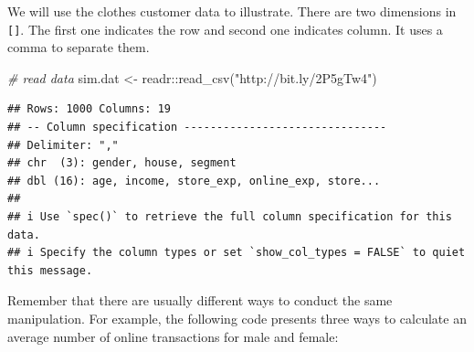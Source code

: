 \documentclass[
  12pt,
]{krantz}
\makeatletter
\newenvironment{Shaded}{\begin{snugshade}}{\end{snugshade}}
\newcommand{\CommentTok}[1]{\textcolor[rgb]{0.37,0.37,0.37}{\textit{#1}}}
\newcommand{\DecValTok}[1]{\textcolor[rgb]{0.06,0.06,0.06}{#1}}
\newcommand{\FunctionTok}[1]{\textcolor[rgb]{0,0,0}{#1}}
\newcommand{\NormalTok}[1]{#1}
\newcommand{\OtherTok}[1]{\textcolor[rgb]{0.37,0.37,0.37}{#1}}
\newcommand{\SpecialCharTok}[1]{\textcolor[rgb]{0,0,0}{#1}}
\newcommand{\StringTok}[1]{\textcolor[rgb]{0.5,0.5,0.5}{#1}}
\newenvironment{kframe}{%
\medskip{}
\setlength{\fboxsep}{.8em}
 \def\at@end@of@kframe{}%
 \ifinner\ifhmode%
  \def\at@end@of@kframe{\end{minipage}}%
  \begin{minipage}{\columnwidth}%
 \fi\fi%
 \def\FrameCommand##1{\hskip\@totalleftmargin \hskip-\fboxsep
 \colorbox{shadecolor}{##1}\hskip-\fboxsep
     \hskip-\linewidth \hskip-\@totalleftmargin \hskip\columnwidth}%
 \MakeFramed {\advance\hsize-\width
   \@totalleftmargin\z@ \linewidth\hsize
   \@setminipage}}%
 {\par\unskip\endMakeFramed%
 \at@end@of@kframe}
\renewenvironment{Shaded}{\begin{kframe}}{\end{kframe}}
\makeatother
\begin{document}
We will use the clothes customer data to illustrate. There are two dimensions in \texttt{{[}{]}}. The first one indicates the row and second one indicates column. It uses a comma to separate them.

\begin{Shaded}
\begin{Highlighting}[]
\CommentTok{\# read data}
\NormalTok{sim.dat }\OtherTok{\textless{}{-}}\NormalTok{ readr}\SpecialCharTok{::}\FunctionTok{read\_csv}\NormalTok{(}\StringTok{"http://bit.ly/2P5gTw4"}\NormalTok{)}
\end{Highlighting}
\end{Shaded}

\begin{verbatim}
## Rows: 1000 Columns: 19
## -- Column specification -------------------------------
## Delimiter: ","
## chr  (3): gender, house, segment
## dbl (16): age, income, store_exp, online_exp, store...
## 
## i Use `spec()` to retrieve the full column specification for this data.
## i Specify the column types or set `show_col_types = FALSE` to quiet this message.
\end{verbatim}

\begin{Shaded}
\end{Shaded}

Remember that there are usually different ways to conduct the same manipulation. For example, the following code presents three ways to calculate an average number of online transactions for male and female:
\end{document}
